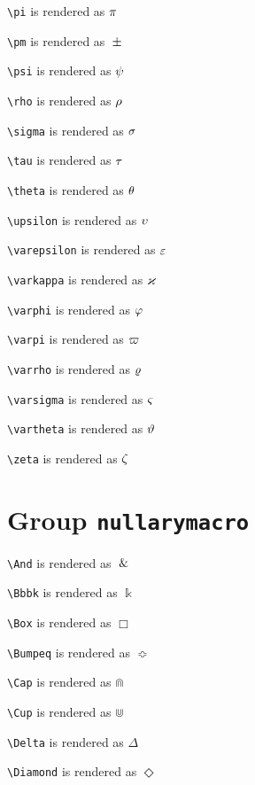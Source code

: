 \texttt{\textbackslash pi} is rendered as $\ce{\pi}$

\texttt{\textbackslash pm} is rendered as $\ce{\pm}$

\texttt{\textbackslash psi} is rendered as $\ce{\psi}$

\texttt{\textbackslash rho} is rendered as $\ce{\rho}$

\texttt{\textbackslash sigma} is rendered as $\ce{\sigma}$

\texttt{\textbackslash tau} is rendered as $\ce{\tau}$

\texttt{\textbackslash theta} is rendered as $\ce{\theta}$

\texttt{\textbackslash upsilon} is rendered as $\ce{\upsilon}$

\texttt{\textbackslash varepsilon} is rendered as $\ce{\varepsilon}$

\texttt{\textbackslash varkappa} is rendered as $\ce{\varkappa}$

\texttt{\textbackslash varphi} is rendered as $\ce{\varphi}$

\texttt{\textbackslash varpi} is rendered as $\ce{\varpi}$

\texttt{\textbackslash varrho} is rendered as $\ce{\varrho}$

\texttt{\textbackslash varsigma} is rendered as $\ce{\varsigma}$

\texttt{\textbackslash vartheta} is rendered as $\ce{\vartheta}$

\texttt{\textbackslash zeta} is rendered as $\ce{\zeta}$

\section{ Group \texttt{nullary\textunderscore macro}}

\texttt{\textbackslash And} is rendered as $\And$

\texttt{\textbackslash Bbbk} is rendered as $\Bbbk$

\texttt{\textbackslash Box} is rendered as $\Box$

\texttt{\textbackslash Bumpeq} is rendered as $\Bumpeq$

\texttt{\textbackslash Cap} is rendered as $\Cap$

\texttt{\textbackslash Cup} is rendered as $\Cup$

\texttt{\textbackslash Delta} is rendered as $\Delta$

\texttt{\textbackslash Diamond} is rendered as $\Diamond$

